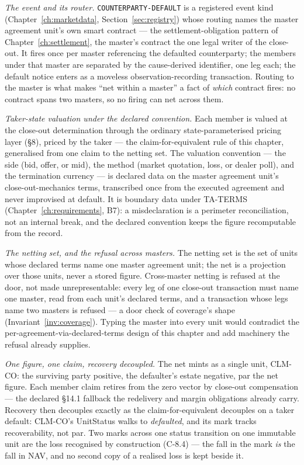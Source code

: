 \documentclass[11pt,a4paper]{article}
\begin{document}
\emph{The event and its router.} \texttt{COUNTERPARTY-DEFAULT} is a registered event kind
(Chapter~\ref{ch:marketdata}, Section~\ref{sec:registry}) whose routing names the master
agreement unit's own smart contract --- the settlement-obligation pattern of
Chapter~\ref{ch:settlement}, the master's contract the one legal writer of the close-out.
It fires once per master referencing the defaulted counterparty; the members under that
master are separated by the cause-derived identifier, one leg each; the default notice
enters as a moveless observation-recording transaction. Routing to the master is what makes
``net within a master'' a fact of \emph{which} contract fires: no contract spans two
masters, so no firing can net across them.

\emph{Taker-state valuation under the declared convention.} Each member is valued at the
close-out determination through the ordinary state-parameterised pricing layer (\S8),
priced by the taker --- the claim-for-equivalent rule of this chapter, generalised from one
claim to the netting set. The valuation convention --- the side (bid, offer, or mid), the
method (market quotation, loss, or dealer poll), and the termination currency --- is
declared data on the master agreement unit's close-out-mechanics terms, transcribed once
from the executed agreement and never improvised at default. It is boundary data under
TA-TERMS (Chapter~\ref{ch:requirements}, B7): a misdeclaration is a perimeter
reconciliation, not an internal break, and the declared convention keeps the figure
recomputable from the record.

\emph{The netting set, and the refusal across masters.} The netting set is the set of units
whose declared terms name one master agreement unit; the net is a projection over those
units, never a stored figure. Cross-master netting is refused at the door, not made
unrepresentable: every leg of one close-out transaction must name one master, read from each
unit's declared terms, and a transaction whose legs name two masters is refused --- a door
check of coverage's shape (Invariant~\ref{inv:coverage}). Typing the master into every unit
would contradict the per-agreement-via-declared-terms design of this chapter and add
machinery the refusal already supplies.

\emph{One figure, one claim, recovery decoupled.} The net mints as a single unit, CLM-CO:
the surviving party positive, the defaulter's estate negative, par the net figure. Each
member claim retires from the zero vector by close-out compensation --- the declared
\S14.1 fallback the redelivery and margin obligations already carry. Recovery then decouples
exactly as the claim-for-equivalent decouples on a taker default: CLM-CO's UnitStatus walks
to \emph{defaulted}, and its mark tracks recoverability, not par. Two marks across one status
transition on one immutable unit are the loss recognised by construction (C-8.4) --- the fall
in the mark \emph{is} the fall in NAV, and no second copy of a realised loss is kept beside
it.
\end{document}
